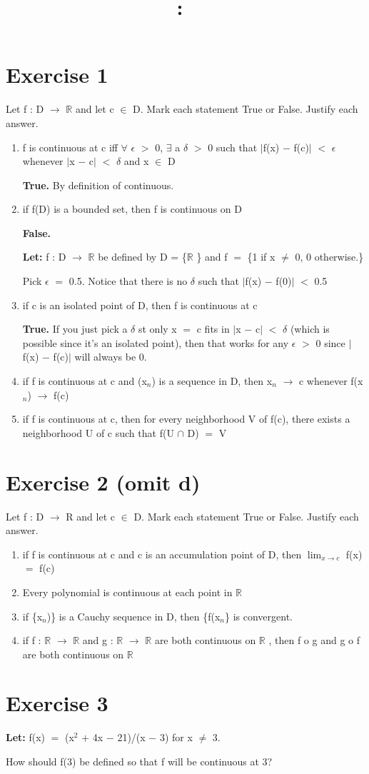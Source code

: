 \documentclass{article}
\title{
    \vspace{2in}
    \textmd{\textbf{\hmwkClass:\ \hmwkTitle}}\\
    \normalsize\vspace{0.1in}\small\vspace{0.1in}\large{\textit{\hmwkClassInstructor}}
    \vspace{3in}
}
\author{\hmwkAuthorName}
\date{}
\newcommand{\mt}[1]{\ensuremath{#1}}
\newcommand\bsc[2][\DefaultOpt]{%
  \def\DefaultOpt{#2}%
  \section[#1]{#2}%
}
\newcommand{\balist}{\begin{enumerate}[label=\alph*.]}
\newcommand{\elist}{\end{enumerate}}
\newcommand{\lt}[1]{\textbf{Let: } #1}
\newcommand{\br}{\mt{\mathbb{R}} }       %
\newcommand{\ep}{\mt{\epsilon} }         %
\newcommand{\fa}{\mt{\forall} }          %
\newcommand{\dta}{\mt{\delta} }
\newcommand{\mem}{\mt{\in} }
\newcommand{\exs}{\mt{\exists} }
\newcommand{\lra}{ \mt{\longrightarrow} } %
\newcommand{\av}[1]{\mt{|}#1\mt{|}}  %
\newcommand{\prn}[1]{(#1)}
\newcommand{\bk}[1]{\{#1\}}
\newcommand{\ps}{\mt{+} }
\newcommand{\ms}{\mt{-} }
\newcommand{\ls}{\mt{<} }
\newcommand{\gr}{\mt{>} }
\newcommand{\eql}{\mt{=} }
\newcommand{\uw}[2]{#1\mt{_{#2}}}
\newcommand{\uf}[2]{#1\mt{^{#2}}}
\newcommand{\limt}[2]{\mt{\displaystyle{\lim_{#1 \to #2}}}}
\newcommand{\inn}{\mt{\cap} }
\begin{document}
\bsc{Exercise 1}{

Let f : D \lra \br and let c \mem D. Mark each statement True or False. Justify each answer.

\balist
\item f is continuous at c iff \fa \ep \gr 0, \exs a \dta \gr 0 such that \av{f(x) \ms f(c)} \ls \ep whenever \av{x \ms c} \ls \dta and x \mem D
	
	\textbf{True.} By definition of continuous.
\item if f(D) is a bounded set, then f is continuous on D
	
	\textbf{False.}
	
	\lt{f : D \lra \br be defined by D = \bk{\br} and f \eql \bk{1 if x $\neq$ 0, 0 otherwise.}}
	
	Pick \ep \eql 0.5. Notice that there is no \dta such that \av{f(x) \ms f(0)} \ls 0.5
\item if c is an isolated point of D, then f is continuous at c
	
	\textbf{True.} If you just pick a \dta st only x \eql c fits in \av{x \ms c} \ls \dta (which is possible since it's an isolated point), then that works for any \ep \gr 0 since \av{f(x) \ms f(c)} will always be 0.
\item if f is continuous at c and \prn{\uw{x}{n}} is a sequence in D, then \uw{x}{n} \lra c whenever f(\uw{x}{n}) \lra f(c)
	
	
\item if f is continuous at c, then for every neighborhood V of f(c), there exists a neighborhood U of c such that f(U \inn D) \eql V
\elist

}

\bsc{Exercise 2 (omit d)}{

Let f : D \lra R and let c \mem D. Mark each statement True or False. Justify each answer.

\balist
\item if f is continuous at c and c is an accumulation point of D, then \limt{x}{c} f(x) \eql f(c)
\item Every polynomial is continuous at each point in \br
\item if \bk{\uw{x}{n})} is a Cauchy sequence in D, then \bk{f(\uw{x}{n}} is convergent.
\item if f : \br \lra \br and g : \br \lra \br are both continuous on \br, then f o g and g o f are both continuous on \br
\elist
}

\bsc{Exercise 3}{

\lt{f(x) \eql \prn{\uf{x}{2} \ps 4x \ms 21}/\prn{x \ms 3} for x $\neq$ 3.}

How should f(3) be defined so that f will be continuous at 3?

}
\end{document}
